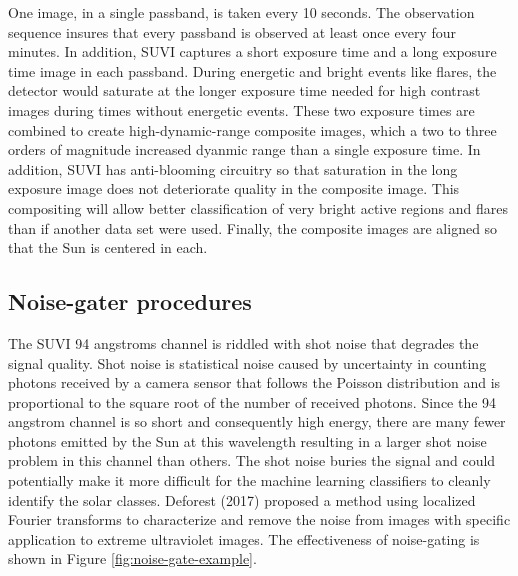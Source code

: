 \documentclass[twoside]{report}
\begin{document}
One image, in a single passband, is taken every 10 seconds. The observation sequence insures that every passband is observed at least once every four minutes. In addition, SUVI captures a short exposure time and a long exposure time image in each passband. During energetic and bright events like flares, the detector would saturate at the longer exposure time needed for high contrast images during times without energetic events. These two exposure times are combined to create high-dynamic-range composite images, which a two to three orders of magnitude increased dyanmic range than a single exposure time. In addition, SUVI has anti-blooming circuitry so that saturation in the long exposure image does not deteriorate quality in the composite image. This compositing will allow better classification of very bright active regions and flares than if another data set were used. Finally, the composite images are aligned so that the Sun is centered in each. 

\subsection{Noise-gater procedures}
The SUVI 94 angstroms channel is riddled with shot noise that degrades the signal quality. Shot noise is statistical noise caused by uncertainty in counting photons received by a camera sensor that follows the Poisson distribution and is proportional to the square root of the number of received photons. Since the 94 angstrom channel is so short and consequently high energy, there are many fewer photons emitted by the Sun at this wavelength resulting in a larger shot noise problem in this channel than others. The shot noise buries the signal and could potentially make it more difficult for the machine learning classifiers to cleanly identify the solar classes. Deforest (2017) proposed a method using localized Fourier transforms to characterize and remove the noise from images with specific application to extreme ultraviolet images. The effectiveness of noise-gating is shown in Figure \ref{fig:noise-gate-example}.
\end{document}
